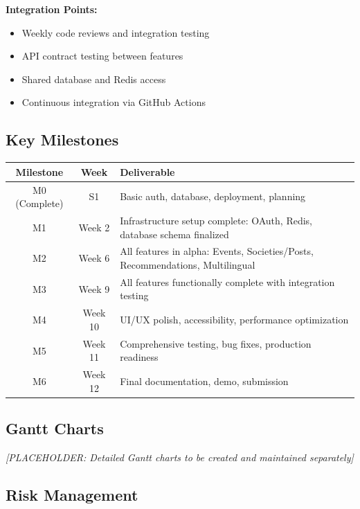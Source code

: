 \documentclass[12pt,a4paper]{article}
\begin{document}
\textbf{Integration Points:}
\begin{itemize}
    \item Weekly code reviews and integration testing
    \item API contract testing between features
    \item Shared database and Redis access
    \item Continuous integration via GitHub Actions
\end{itemize}

\subsection{Key Milestones}

\begin{table}[h]
\centering
\begin{tabular}{|c|c|p{8cm}|}
\hline
\textbf{Milestone} & \textbf{Week} & \textbf{Deliverable} \\
\hline
M0 (Complete) & S1 & Basic auth, database, deployment, planning \\
\hline
M1 & Week 2 & Infrastructure setup complete: OAuth, Redis, database schema finalized \\
\hline
M2 & Week 6 & All features in alpha: Events, Societies/Posts, Recommendations, Multilingual \\
\hline
M3 & Week 9 & All features functionally complete with integration testing \\
\hline
M4 & Week 10 & UI/UX polish, accessibility, performance optimization \\
\hline
M5 & Week 11 & Comprehensive testing, bug fixes, production readiness \\
\hline
M6 & Week 12 & Final documentation, demo, submission \\
\hline
\end{tabular}
\end{table}

\subsection{Gantt Charts}

\textit{[PLACEHOLDER: Detailed Gantt charts to be created and maintained separately]}

\subsection{Risk Management}
\end{document}
